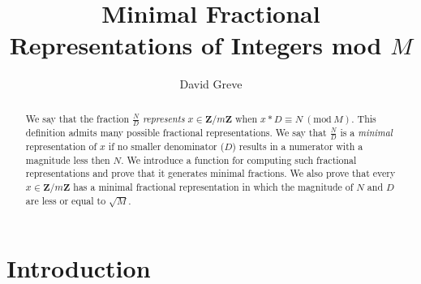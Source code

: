 \documentclass[submission,copyright,creativecommons]{eptcs}
\title{Minimal Fractional Representations of Integers mod $M$ }
\author{David Greve
\email{david@thegreves.com}
}
\newcommand{\Mod}[1]{\ (\mathrm{mod}\ #1)}
\begin{document}
\maketitle

\begin{abstract}

We say that the fraction $\frac{N}{D}$ \emph{represents} $x \in
\mathbf{Z}/m\mathbf{Z}$ when $x*D \equiv N \Mod{M}$.  This definition
admits many possible fractional representations.  We say that
$\frac{N}{D}$ is a \emph{minimal} representation of $x$ if no smaller
denominator ($D$) results in a numerator with a magnitude less then
$N$.  We introduce a function for computing such fractional
representations and prove that it generates minimal fractions.  We
also prove that every $x \in \mathbf{Z}/m\mathbf{Z}$ has a minimal
fractional representation in which the magnitude of $N$ and $D$
are less or equal to $\sqrt{M}$.

\end{abstract}

\section{Introduction}
\end{document}
